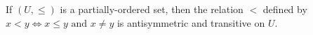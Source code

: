 If $(U, \leq)$ is a partially-ordered set, then the relation $<$ defined by $x < y \Leftrightarrow x \leq y \text{ and } x \neq y$ is antisymmetric and transitive on $U$.

